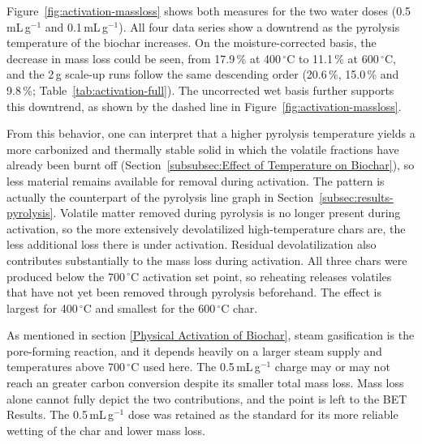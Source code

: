 Figure~\ref{fig:activation-massloss} shows both measures for the two water doses (0.5\,mL\,g$^{-1}$ and 0.1\,mL\,g$^{-1}$). All four data series show a downtrend as the pyrolysis temperature of the biochar increases. On the moisture-corrected basis, the decrease in mass loss could be seen, from 17.9\,\% at 400\,$^{\circ}$C to 11.1\,\% at 600\,$^{\circ}$C, and the 2\,g scale-up runs follow the same descending order (20.6\,\%, 15.0\,\% and 9.8\,\%; Table~\ref{tab:activation-full}). The uncorrected wet basis further supports this downtrend, as shown by the dashed line in Figure~\ref{fig:activation-massloss}.

\vspace{0.3em}

From this behavior, one can interpret that a higher pyrolysis temperature yields a more carbonized and thermally stable solid in which the volatile fractions have already been burnt off (Section~\ref{subsubsec:Effect of Temperature on Biochar}), so less material remains available for removal during activation. The pattern is actually the counterpart of the pyrolysis line graph in Section~\ref{subsec:results-pyrolysis}. Volatile matter removed during pyrolysis is no longer present during activation, so the more extensively devolatilized high-temperature chars are, the less additional loss there is under activation. Residual devolatilization also contributes substantially to the mass loss during activation. All three chars were produced below the 700\,$^{\circ}$C activation set point, so reheating releases volatiles that have not yet been removed through pyrolysis beforehand. The effect is largest for 400\,$^{\circ}$C and smallest for the 600\,$^{\circ}$C char.

\vspace{0.3em}

As mentioned in section \ref{Physical Activation of Biochar}, steam gasification is the pore-forming reaction, and it depends heavily on a larger steam supply and temperatures above 700\,$^{\circ}$C used here. The 0.5\,mL\,g$^{-1}$ charge may or may not reach an greater carbon conversion despite its smaller total mass loss. Mass loss alone cannot fully depict the two contributions, and the point is left to the BET Results. The 0.5\,mL\,g$^{-1}$ dose was retained as the standard for its more reliable wetting of the char and lower mass loss.


